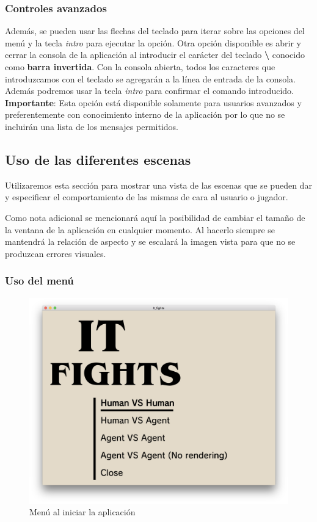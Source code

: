 \subsubsection{Controles avanzados}

Además, se pueden usar las flechas del teclado para iterar sobre las opciones del menú y la tecla \textit{intro} para ejecutar la opción. Otra opción disponible es abrir y cerrar la consola de la aplicación al introducir el carácter del teclado \textbf{\textbackslash} conocido como \textbf{barra invertida}. Con la consola abierta, todos los caracteres que introduzcamos con el teclado se agregarán a la línea de entrada de la consola. Además podremos usar la tecla \textit{intro} para confirmar el comando introducido. \textbf{Importante}: Esta opción está disponible solamente para usuarios avanzados y preferentemente con conocimiento interno de la aplicación por lo que no se incluirán una lista de los mensajes permitidos.

\subsection{Uso de las diferentes escenas}

Utilizaremos esta sección para mostrar una vista de las escenas que se pueden dar y especificar el comportamiento de las mismas de cara al usuario o jugador.

\bigskip

Como nota adicional se mencionará aquí la posibilidad de cambiar el tamaño de la ventana de la aplicación en cualquier momento. Al hacerlo siempre se mantendrá la relación de aspecto y se escalará la imagen vista para que no se produzcan errores visuales.

\subsubsection{Uso del menú}

\begin{figure}[h]
	\centerline{\includegraphics[width=17cm]{otros/manual/menu1.png}}
	\caption{Menú al iniciar la aplicación}
	\label{uso:menu}
\end{figure}

